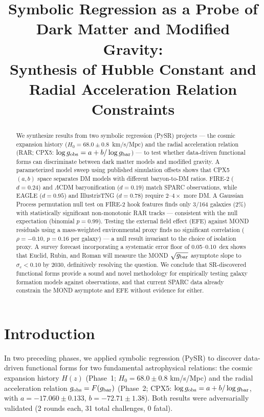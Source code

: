 \documentclass[twocolumn]{aastex631}
\begin{document}
\title{Symbolic Regression as a Probe of Dark Matter and Modified Gravity:\\
Synthesis of Hubble Constant and Radial Acceleration Relation Constraints}

\author{}

\begin{abstract}
We synthesize results from two symbolic regression (PySR) projects --- the
cosmic expansion history ($H_0 = 68.0 \pm 0.8$~km/s/Mpc) and the radial
acceleration relation (RAR; CPX5: $\log g_{\rm obs} = a + b/\log g_{\rm
bar}$) --- to test whether data-driven functional forms can discriminate
between dark matter models and modified gravity.  A parameterized model
sweep using published simulation offsets shows that CPX5 $(a,b)$ space
separates DM models with different baryon-to-DM ratios.  FIRE-2
($d=0.24$) and $\Lambda$CDM baryonification ($d=0.19$) match SPARC
observations, while EAGLE ($d=0.95$) and IllustrisTNG ($d=0.78$) require
$2$--$4\times$ more DM.  A Gaussian Process permutation null test on
FIRE-2 hook features finds only 3/164 galaxies (2\%) with statistically
significant non-monotonic RAR tracks --- consistent with the null
expectation (binomial $p = 0.99$).  Testing the external field effect
(EFE) against MOND residuals using a mass-weighted environmental proxy
finds no significant correlation ($\rho = -0.10$, $p = 0.16$ per
galaxy) --- a null result invariant to the choice of isolation proxy.
A survey forecast incorporating a systematic error floor of 0.05--0.10~dex
shows that Euclid, Rubin, and Roman will measure the MOND $\sqrt{g_{\rm
bar}}$ asymptote slope to $\sigma_c < 0.10$ by 2030, definitively
resolving the question.  We conclude that SR-discovered functional forms
provide a sound and novel methodology for empirically testing
galaxy formation models against observations, and that current SPARC
data already constrain the MOND asymptote and EFE without evidence for
either.
\end{abstract}

\section{Introduction}

In two preceding phases, we applied symbolic regression (PySR) to discover
data-driven functional forms for two fundamental astrophysical relations:
the cosmic expansion history $H(z)$ (Phase~1; $H_0 = 68.0 \pm 0.8$
km/s/Mpc) and the radial acceleration relation $g_{\rm obs} = F(g_{\rm
bar})$ (Phase~2; CPX5: $\log g_{\rm obs} = a + b/\log g_{\rm bar}$, with
$a = -17.060 \pm 0.133$, $b = -72.71 \pm 1.38$).  Both results were
adversarially validated (2 rounds each, 31 total challenges, 0 fatal).
\end{document}
